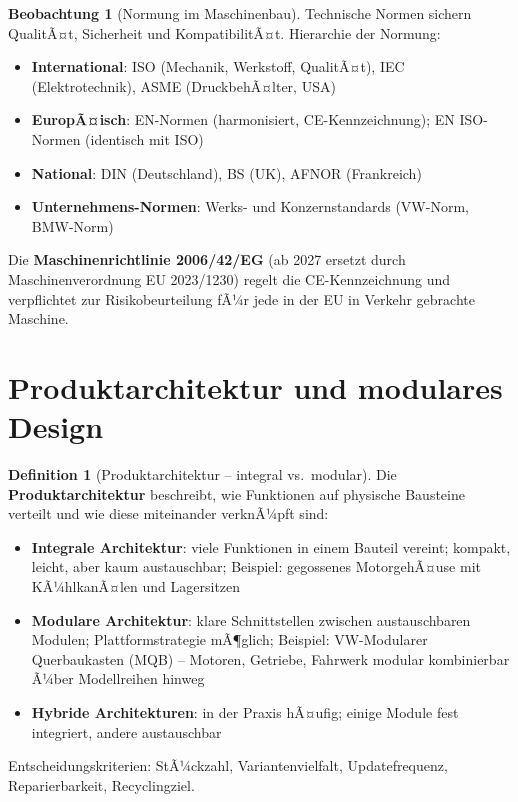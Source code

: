 ﻿\documentclass[a4paper,12pt]{report}
\theoremstyle{definition}
\newtheorem{definition}{Definition}
\newtheorem{beobachtung}{Beobachtung}
\begin{document}
\begin{beobachtung}[Normung im Maschinenbau]
Technische Normen sichern QualitÃ¤t, Sicherheit und KompatibilitÃ¤t.
Hierarchie der Normung:
\begin{itemize}
    \item[-] \textbf{International}: ISO (Mechanik, Werkstoff, QualitÃ¤t),
          IEC (Elektrotechnik), ASME (DruckbehÃ¤lter, USA)
    \item[-] \textbf{EuropÃ¤isch}: EN-Normen (harmonisiert, CE-Kennzeichnung);
          EN ISO-Normen (identisch mit ISO)
    \item[-] \textbf{National}: DIN (Deutschland), BS (UK), AFNOR (Frankreich)
    \item[-] \textbf{Unternehmens-Normen}: Werks- und Konzernstandards
          (VW-Norm, BMW-Norm)
\end{itemize}
Die \textbf{Maschinenrichtlinie 2006/42/EG} (ab 2027 ersetzt durch
Maschinenverordnung EU 2023/1230) regelt die CE-Kennzeichnung
und verpflichtet zur Risikobeurteilung fÃ¼r jede in der EU in
Verkehr gebrachte Maschine.
\end{beobachtung}


\section{Produktarchitektur und modulares Design}

\begin{definition}[Produktarchitektur -- integral vs.\ modular]
Die \textbf{Produktarchitektur} beschreibt, wie Funktionen auf physische
Bausteine verteilt und wie diese miteinander verknÃ¼pft sind:
\begin{itemize}
    \item[-] \textbf{Integrale Architektur}: viele Funktionen in einem
          Bauteil vereint; kompakt, leicht, aber kaum austauschbar;
          Beispiel: gegossenes MotorgehÃ¤use mit KÃ¼hlkanÃ¤len und Lagersitzen
    \item[-] \textbf{Modulare Architektur}: klare Schnittstellen zwischen
          austauschbaren Modulen; Plattformstrategie mÃ¶glich;
          Beispiel: VW-Modularer Querbaukasten (MQB) -- Motoren, Getriebe,
          Fahrwerk modular kombinierbar Ã¼ber Modellreihen hinweg
    \item[-] \textbf{Hybride Architekturen}: in der Praxis hÃ¤ufig;
          einige Module fest integriert, andere austauschbar
\end{itemize}
Entscheidungskriterien: StÃ¼ckzahl, Variantenvielfalt, Updatefrequenz,
Reparierbarkeit, Recyclingziel.
\end{definition}
\end{document}
